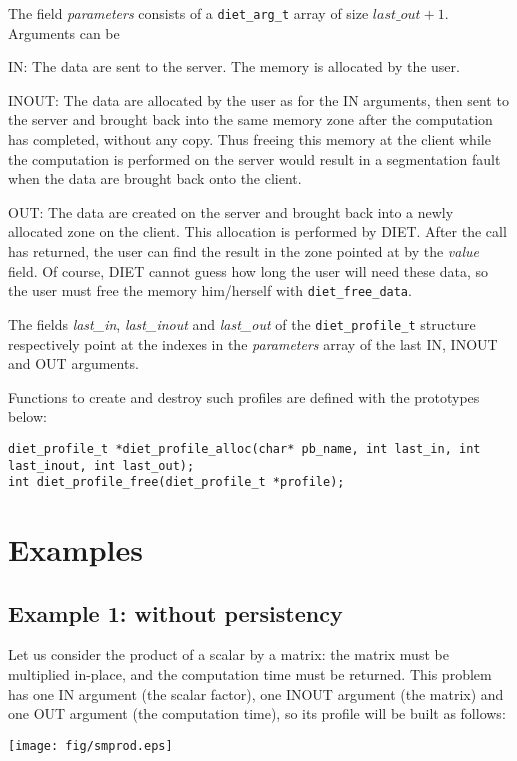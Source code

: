 The field \emph{parameters} consists of a \texttt{diet\_arg\_t} array of size
$last\_out + 1$. Arguments can be
\begin{description}
\item{IN:}    The data are sent to the server. The memory is allocated
  by the user.
\item{INOUT:} The data are allocated by the user as for the IN
  arguments, then sent to the server and brought back into the same memory zone
  after the computation has completed, without any copy. Thus freeing this
  memory at the client while the computation is performed on the
  server would result in a segmentation fault when the data are
  brought back onto the client.
\item{OUT:} The data are created on the server and brought back into a
  newly allocated zone on the client. This allocation is performed by
  DIET. After the call has returned, the user can find the result in
  the zone pointed at by the \emph{value} field. Of course, DIET
  cannot guess how long the user will need these data, so the
  user must free the memory him/herself with \texttt{diet\_free\_data}.
\end{description}


The fields \emph{last\_in}, \emph{last\_inout} and \emph{last\_out} of the
\texttt{diet\_profile\_t} structure respectively point at the indexes in the
\emph{parameters} array of the last IN, INOUT and OUT arguments.

Functions to create and destroy such profiles are defined with the prototypes
below:
{\footnotesize
\begin{verbatim}
diet_profile_t *diet_profile_alloc(char* pb_name, int last_in, int last_inout, int last_out);
int diet_profile_free(diet_profile_t *profile);
\end{verbatim}
}



\section{Examples}
\label{sec:pbex}

\subsection{Example 1: without persistency}
Let us consider the product of a scalar by a matrix: the matrix must be
multiplied in-place, and the computation time must be returned.  This
problem has one IN argument (the scalar factor), one INOUT argument (the matrix)
and one OUT argument (the computation time), so its profile will be built as
follows:
\begin{center}
\texttt{[image: fig/smprod.eps]}
\end{center}

